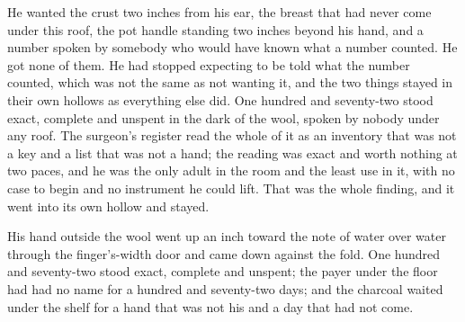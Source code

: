 He wanted the crust two inches from his ear, the breast that had never come under this roof, the pot handle standing two inches beyond his hand, and a number spoken by somebody who would have known what a number counted. He got none of them. He had stopped expecting to be told what the number counted, which was not the same as not wanting it, and the two things stayed in their own hollows as everything else did. One hundred and seventy-two stood exact, complete and unspent in the dark of the wool, spoken by nobody under any roof. The surgeon's register read the whole of it as an inventory that was not a key and a list that was not a hand; the reading was exact and worth nothing at two paces, and he was the only adult in the room and the least use in it, with no case to begin and no instrument he could lift. That was the whole finding, and it went into its own hollow and stayed.

His hand outside the wool went up an inch toward the note of water over water through the finger's-width door and came down against the fold. One hundred and seventy-two stood exact, complete and unspent; the payer under the floor had had no name for a hundred and seventy-two days; and the charcoal waited under the shelf for a hand that was not his and a day that had not come.

